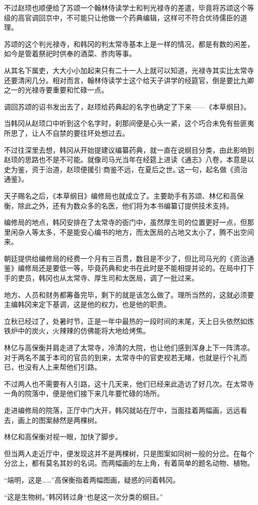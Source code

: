 不过赵顼也顺便给了苏颂一个翰林侍读学士和判光禄寺的差遣，毕竟将苏颂这个等级的高官调回京中，不可能只让他做一个药典编辑，这样可不符合优待儒臣的道理。

苏颂的这个判光禄寺，和韩冈的判太常寺基本上是一样的情况，都是有数的闲差，如今是管着祭祀时供奉的酒菜、胙肉等事。

从其名下属吏，大大小小加起来只有二十一人上就可以知道，光禄寺其实比太常寺还要清闲几分。相对而言，翰林侍读学士这个给天子讲学的经筵官，倒是要比九卿之一的光禄寺要重要和忙碌一点。

调回苏颂的诏书发出去了，赵顼给药典起的名字也确定了下来——《本草纲目》。

当韩冈从赵顼口中听到这个名字时，刹那间便是心头一紧，这个巧合未免有些匪夷所思了，让人不自禁的要往坏处想过去。

不过往深里去想，韩冈从开始提建议编纂药典，就一直在说纲目分类，由此影响到赵顼的思路也不是不可能。就像司马光当年在经筵上进读《通志》八卷，本意是以史为鉴，资于治道，赵顼便援引‘商鉴不远，在夏后之世。’这一句，起名做《资治通鉴》。

天子赐名之后，《本草纲目》编修局也就成立了。主要助手有苏颂、林亿和高保衡，除此之外，还有为数众多的名医，他们将为本书编纂订提供技术支持。

编修局的地点，韩冈安排在了太常寺的衙门中，虽然厚生司的位置更好一点，但那里闲杂人等太多，不是能安心编书的地方，而太医局的占地又太小了，腾不出空间来。

朝廷提供给编修局的经费一个月有三百贯，数目是不少了，但比司马光的《资治通鉴》编修局还是要低一等，毕竟药典和史书在此时是不能相提并论的。在局中打下手的吏员，韩冈也从太常寺、厚生司和太医局，调了一批过来。

地方、人员和财务都筹备完毕，剩下的就是该怎么做了。理所当然的，这就必须要主编韩冈来定下基调，这是他的权力，也是他的职责。

立秋已经过了，处暑时节，正是一年中最热的一段时间的末尾，天上日头依然如炼铁炉中的炭火，火辣辣的仿佛能将大地给烤焦。

林亿与高保衡并肩走进了太常寺，冷清的大院，也让他们感到浑身上下一阵清凉。对于两名不属于本司的官员的到来，太常寺中的官吏视若无睹，也就是行个礼而已，也没有人上来帮他们引路。

不过两人也不需要有人引路，这十几天来，他们已经来此造访了好几次。在太常寺一角的院落中，便是他们接下来几年要忙碌的场所。

走进编修局的院落，正厅中门大开，韩冈就站在厅中，当面挂着两幅画，远远看去，画上的图案赫然是两棵树。

林亿和高保衡对视一眼，加快了脚步。

但当两人走近厅中，便发现这并不是两棵树，只是图案如同树一般的分岔。在每个分岔上，都有莫名其妙的名词。而两幅画的左上角，有着简单的题名动物、植物。

“端明，这是……”高保衡指着两幅图画，疑惑的问着韩冈。

“这是生物树。”韩冈转过身“也是这一次分类的纲目。”

